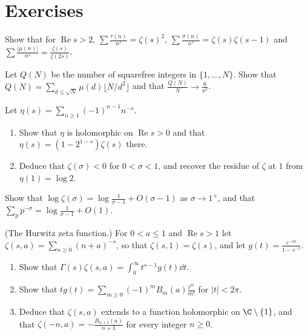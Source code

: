 \section{Exercises}

\begin{exercise}[$\star$]\label{ex:tau}
Show that for $\operatorname{Re}s>2$, $\sum\frac{\tau(n)}{n^s}=\zeta(s)^2$, $\sum\frac{\sigma(n)}{n^s}=\zeta(s)\zeta(s-1)$ and $\sum\frac{|\mu(n)|}{n^s}=\frac{\zeta(s)}{\zeta(2s)}$.
\end{exercise}

\begin{exercise}[$\star\star$]\label{ex:squarefree}
Let $Q(N)$ be the number of squarefree integers in $\{1,\dots,N\}$. Show that $Q(N)=\sum_{d\le\sqrt N}\mu(d)\lfloor N/d^2\rfloor$ and that $\frac{Q(N)}N\to\frac6{\pi^2}$.
\end{exercise}

\begin{exercise}[$\star\star$]\label{ex:eta}
Let $\eta(s)=\sum_{n\ge1}(-1)^{n-1}n^{-s}$.
\begin{enumerate}[label=(\alph*)]
\item Show that $\eta$ is holomorphic on $\operatorname{Re}s>0$ and that $\eta(s)=(1-2^{1-s})\zeta(s)$ there.
\item Deduce that $\zeta(\sigma)<0$ for $0<\sigma<1$, and recover the residue of $\zeta$ at $1$ from $\eta(1)=\log2$.
\end{enumerate}
\end{exercise}

\begin{exercise}[$\star\star$]\label{ex:primesum}
Show that $\log\zeta(\sigma)=\log\frac1{\sigma-1}+O(\sigma-1)$ as $\sigma\to1^+$, and that $\sum_pp^{-\sigma}=\log\frac1{\sigma-1}+O(1)$.
\end{exercise}

\begin{exercise}[$\star\star\star$]\label{ex:hurwitz}
(The Hurwitz zeta function.) For $0<a\le1$ and $\operatorname{Re}s>1$ let $\zeta(s,a)=\sum_{n\ge0}(n+a)^{-s}$, so that $\zeta(s,1)=\zeta(s)$, and let $g(t)=\frac{e^{-at}}{1-e^{-t}}$.
\begin{enumerate}[label=(\alph*)]
\item Show that $\Gamma(s)\zeta(s,a)=\int_0^\infty t^{s-1}g(t)\dd t$.
\item Show that $tg(t)=\sum_{m\ge0}(-1)^mB_m(a)\frac{t^m}{m!}$ for $|t|<2\pi$.
\item Deduce that $\zeta(s,a)$ extends to a function holomorphic on $\C\setminus\{1\}$, and that $\zeta(-n,a)=-\frac{B_{n+1}(a)}{n+1}$ for every integer $n\ge0$.
\end{enumerate}
\end{exercise}

